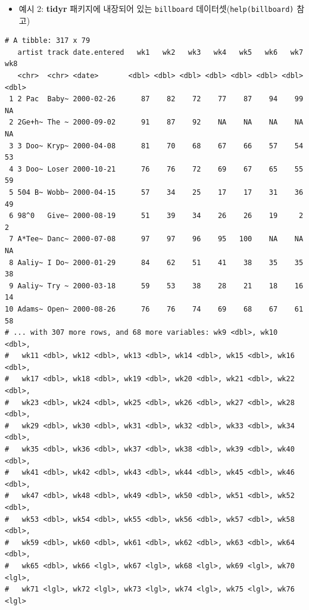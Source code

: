 \documentclass[
  11pt,
]{krantz}
\newenvironment{Shaded}{\begin{snugshade}}{\end{snugshade}}
\newcommand{\NormalTok}[1]{#1}
\newcommand{\OperatorTok}[1]{\textcolor[rgb]{0.43,0.43,0.43}{\textbf{#1}}}
\newcommand{\StringTok}[1]{\textcolor[rgb]{0.5,0.5,0.5}{#1}}
\providecommand{\tightlist}{%
  \setlength{\itemsep}{0pt}\setlength{\parskip}{0pt}}
\begin{document}
\begin{itemize}
\tightlist
\item
  예시 2: \textbf{tidyr} 패키지에 내장되어 있는 \texttt{billboard} 데이터셋(\texttt{help(billboard)} 참고)
\end{itemize}

\footnotesize

\begin{Shaded}
\end{Shaded}

\begin{verbatim}
# A tibble: 317 x 79
   artist track date.entered   wk1   wk2   wk3   wk4   wk5   wk6   wk7   wk8
   <chr>  <chr> <date>       <dbl> <dbl> <dbl> <dbl> <dbl> <dbl> <dbl> <dbl>
 1 2 Pac  Baby~ 2000-02-26      87    82    72    77    87    94    99    NA
 2 2Ge+h~ The ~ 2000-09-02      91    87    92    NA    NA    NA    NA    NA
 3 3 Doo~ Kryp~ 2000-04-08      81    70    68    67    66    57    54    53
 4 3 Doo~ Loser 2000-10-21      76    76    72    69    67    65    55    59
 5 504 B~ Wobb~ 2000-04-15      57    34    25    17    17    31    36    49
 6 98^0   Give~ 2000-08-19      51    39    34    26    26    19     2     2
 7 A*Tee~ Danc~ 2000-07-08      97    97    96    95   100    NA    NA    NA
 8 Aaliy~ I Do~ 2000-01-29      84    62    51    41    38    35    35    38
 9 Aaliy~ Try ~ 2000-03-18      59    53    38    28    21    18    16    14
10 Adams~ Open~ 2000-08-26      76    76    74    69    68    67    61    58
# ... with 307 more rows, and 68 more variables: wk9 <dbl>, wk10 <dbl>,
#   wk11 <dbl>, wk12 <dbl>, wk13 <dbl>, wk14 <dbl>, wk15 <dbl>, wk16 <dbl>,
#   wk17 <dbl>, wk18 <dbl>, wk19 <dbl>, wk20 <dbl>, wk21 <dbl>, wk22 <dbl>,
#   wk23 <dbl>, wk24 <dbl>, wk25 <dbl>, wk26 <dbl>, wk27 <dbl>, wk28 <dbl>,
#   wk29 <dbl>, wk30 <dbl>, wk31 <dbl>, wk32 <dbl>, wk33 <dbl>, wk34 <dbl>,
#   wk35 <dbl>, wk36 <dbl>, wk37 <dbl>, wk38 <dbl>, wk39 <dbl>, wk40 <dbl>,
#   wk41 <dbl>, wk42 <dbl>, wk43 <dbl>, wk44 <dbl>, wk45 <dbl>, wk46 <dbl>,
#   wk47 <dbl>, wk48 <dbl>, wk49 <dbl>, wk50 <dbl>, wk51 <dbl>, wk52 <dbl>,
#   wk53 <dbl>, wk54 <dbl>, wk55 <dbl>, wk56 <dbl>, wk57 <dbl>, wk58 <dbl>,
#   wk59 <dbl>, wk60 <dbl>, wk61 <dbl>, wk62 <dbl>, wk63 <dbl>, wk64 <dbl>,
#   wk65 <dbl>, wk66 <lgl>, wk67 <lgl>, wk68 <lgl>, wk69 <lgl>, wk70 <lgl>,
#   wk71 <lgl>, wk72 <lgl>, wk73 <lgl>, wk74 <lgl>, wk75 <lgl>, wk76 <lgl>
\end{verbatim}
\end{document}
